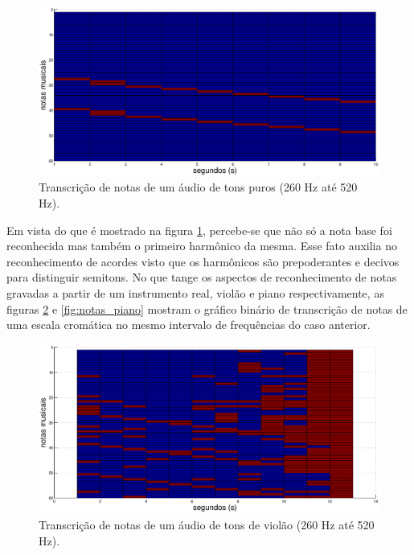 \begin{figure}[h]
    \centering
    \includegraphics[keepaspectratio=true,scale=0.4]{figuras/notas_puras.eps}
  \caption{Transcrição de notas de um áudio de tons puros (260 Hz até 520 Hz).}
  \label{fig:notas_puras}
\end{figure}       

Em vista do que é mostrado na figura \ref{fig:notas_puras}, percebe-se que não só a nota base foi reconhecida mas também o primeiro harmônico da mesma. Esse fato auxilia no reconhecimento de acordes visto que os harmônicos são prepoderantes e decivos para distinguir semitons. No que tange os aspectos de reconhecimento de notas gravadas a partir de um instrumento real, violão e piano respectivamente, as figuras \ref{fig:notas_violao} e \ref{fig:notas_piano} mostram o gráfico binário de transcrição de notas de uma escala cromática no mesmo intervalo de frequências do caso anterior.

\begin{figure}[h]
    \centering
    \includegraphics[keepaspectratio=true,scale=0.5]{figuras/notas_violao.eps}
  \caption{Transcrição de notas de um áudio de tons de violão (260 Hz até 520 Hz).}
  \label{fig:notas_violao}
\end{figure}       

